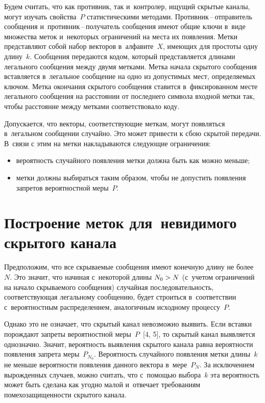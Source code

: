 \begin{multicols}{2}
  Будем считать, что как противник, так и~контролер, ищущий скрытые каналы,
могут изучать свойства~$P$ статистическими методами.
Противник\,--\,от\-пра\-ви\-тель сообщения и~про\-тив\-ник\,--\,по\-лу\-ча\-тель сообщения имеют общие
ключи в~виде множества меток и~некоторых ограничений на места их
появления. Метки представляют собой набор векторов в~алфавите~$X$,
имеющих для простоты одну длину~$k$. Сообщения передаются кодом,
который представляется длинами легального сообщения между двумя метками.
Метка начала скрытого сообщения вставляется в~легальное сообщение на одно
из допустимых мест, определяемых ключом. Метка окончания скрытого
сообщения ставится в~фиксированном месте легального сообщения на
расстоянии от последнего символа входной метки так, чтобы расстояние между
метками соответствовало коду.

  Допускается, что векторы, соответствующие меткам, могут появляться
в~легальном сообщении случайно. Это может привести к сбою скрытой
передачи. В~связи с этим на метки накладываются следующие ограничения:
  \begin{itemize}
\item вероятность случайного появления метки должна быть как можно
меньше;\\[-14pt]
\item метки должны выбираться таким образом, чтобы не допустить
появления запретов вероятностной меры~$P$.
\end{itemize}

\vspace*{-10pt}

\section{Построение меток для~невидимого скрытого канала}

  Предположим, что все скрываемые сообщения имеют конечную длину не
более~$N$. Это значит, что начиная с~некоторой длины $N_0\hm>N$ (с~\mbox{учетом}
ограничений на начало скрываемого сообщения) \mbox{случайная} последовательность,
соответствующая легальному сообщению, будет строиться в~соответствии
с~вероятностным распределением, аналогичным исходному процессу~$P$.

  Однако это не означает, что скрытый канал невозможно выявить. Если
вставки порождают запреты вероятностной меры~$P$~[4, 5], то скрытый канал
выявляется однозначно. Значит, вероятность выявления скрытого канала равна
вероятности появления запрета меры~$P_{N_0}$. Вероятность случайного
появления метки длины~$k$ не меньше вероятности появления данного вектора
в~мере~$P_N$. За исключением вырожденных случаев, можно считать, что
с~помощью выбора~$k$ эта вероятность может быть сделана как угодно малой
и~отвечает требованиям помехозащищенности скрытого канала.


\end{multicols}

